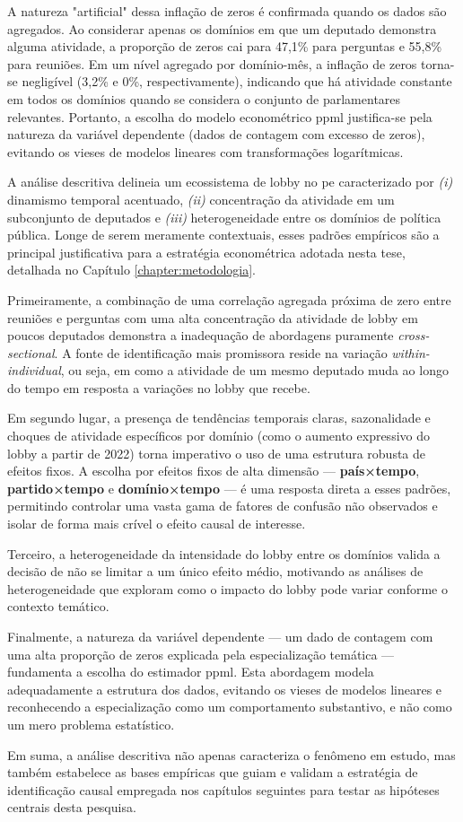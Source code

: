 A natureza "artificial" dessa inflação de zeros é confirmada quando os dados são agregados. Ao considerar apenas os domínios em que um deputado demonstra alguma atividade, a proporção de zeros cai para 47,1\% para perguntas e 55,8\% para reuniões. Em um nível agregado por domínio-mês, a inflação de zeros torna-se negligível (3,2\% e 0\%, respectivamente), indicando que há atividade constante em todos os domínios quando se considera o conjunto de parlamentares relevantes. Portanto, a escolha do modelo econométrico \acrshort{ppml} justifica-se pela natureza da variável dependente (dados de contagem com excesso de zeros), evitando os vieses de modelos lineares com transformações logarítmicas.

A análise descritiva delineia um ecossistema de lobby no \acrshort{pe} caracterizado por \textit{(i)} dinamismo temporal acentuado, \textit{(ii)} concentração da atividade em um subconjunto de deputados e \textit{(iii)} heterogeneidade entre os domínios de política pública. Longe de serem meramente contextuais, esses padrões empíricos são a principal justificativa para a estratégia econométrica adotada nesta tese, detalhada no Capítulo \ref{chapter:metodologia}.

Primeiramente, a combinação de uma correlação agregada próxima de zero entre reuniões e perguntas com uma alta concentração da atividade de lobby em poucos deputados demonstra a inadequação de abordagens puramente \textit{cross-sectional}. A fonte de identificação mais promissora reside na variação \textit{within-individual}, ou seja, em como a atividade de um mesmo deputado muda ao longo do tempo em resposta a variações no lobby que recebe.

Em segundo lugar, a presença de tendências temporais claras, sazonalidade e choques de atividade específicos por domínio (como o aumento expressivo do lobby a partir de 2022) torna imperativo o uso de uma estrutura robusta de efeitos fixos. A escolha por efeitos fixos de alta dimensão — \textbf{país×tempo}, \textbf{partido×tempo} e \textbf{domínio×tempo} — é uma resposta direta a esses padrões, permitindo controlar uma vasta gama de fatores de confusão não observados e isolar de forma mais crível o efeito causal de interesse.

Terceiro, a heterogeneidade da intensidade do lobby entre os domínios valida a decisão de não se limitar a um único efeito médio, motivando as análises de heterogeneidade que exploram como o impacto do lobby pode variar conforme o contexto temático.

Finalmente, a natureza da variável dependente — um dado de contagem com uma alta proporção de zeros explicada pela especialização temática — fundamenta a escolha do estimador \acrshort{ppml}. Esta abordagem modela adequadamente a estrutura dos dados, evitando os vieses de modelos lineares e reconhecendo a especialização como um comportamento substantivo, e não como um mero problema estatístico.

Em suma, a análise descritiva não apenas caracteriza o fenômeno em estudo, mas também estabelece as bases empíricas que guiam e validam a estratégia de identificação causal empregada nos capítulos seguintes para testar as hipóteses centrais desta pesquisa.

